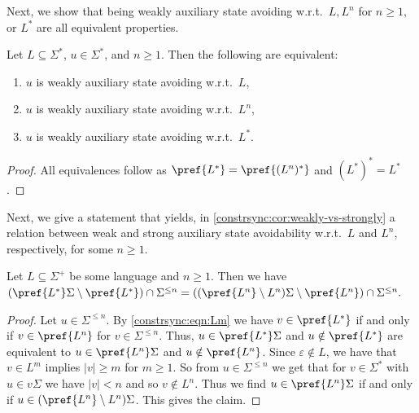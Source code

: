 Next, we show that being weakly auxiliary state avoiding
w.r.t.~$L, L^n$ for $n \ge 1$, or $L^*$ are all equivalent properties.

\begin{proposition}
	\label{constrsync:prop:auxLn}
	\label{constrsync:prop:weakly-n-strongly}
	
	Let $L \subseteq \Sigma^*$, $u \in \Sigma^*$, and $n \ge 1$. 
	Then the following are equivalent:
	\begin{enumerate}
		\item $u$ is weakly auxiliary state avoiding w.r.t.~$L$,
		
		\item $u$ is weakly auxiliary state avoiding w.r.t.~$L^n$,
		
		\item $u$ is weakly auxiliary state avoiding w.r.t.~$L^*$.		
	\end{enumerate}
\end{proposition} 
\begin{proof}
    All equivalences follow as $\pref{L^*} = \pref{(L^n)^*}$ and $(L^{*})^* = L^*$.
\end{proof}

Next, we give a statement that yields, in \cref{constrsync:cor:weakly-vs-strongly}
a relation between weak and strong auxiliary state avoidability
w.r.t.~$L$ and $L^n$, respectively, for some $n \ge 1$.

\begin{proposition} \label{constrsync:prop:weakly-vs-strongly} \label{constrsync:item:Ln1}
	Let $L \subseteq \Sigma^+$ be some language and $n \ge 1$.  Then we have
	$
	( \pref{L^*}\Sigma \setminus \pref{L^*} ) \cap \Sigma^{\le n} 
	= ( ( \pref{L^n} \setminus L^n ) \Sigma \setminus \pref{L^n} ) \cap \Sigma^{\le n}.
	$
\end{proposition}
\begin{proof}
	Let $u \in \Sigma^{\le n}$. By \cref{constrsync:eqn:Lm}
	we have $v \in \pref{L^*}$ if and only if $v\in \pref{L^n}$ for $v \in \Sigma^{\le n}$.
	Thus, $u \in \pref{L^*}\Sigma$
	and $u \notin \pref{L^*}$ 
	are equivalent to $u \in \pref{L^n}\Sigma$
	and $u\notin \pref{L^n}$.
	Since $\varepsilon \notin L$,
	we have that $v \in L^m$ implies $|v| \ge m$ for $m \ge 1$.
	So from $u \in \Sigma^{\le n}$
	we get that for $v \in \Sigma^*$ with $u \in v\Sigma$
	we have $|v| < n$ 
	and so $v \notin L^n$.
	Thus we find $u \in \pref{L^n}\Sigma$
	if and only if $u \in ( \pref{L^n} \setminus L^n )\Sigma$.
	This gives the claim.
\end{proof}

